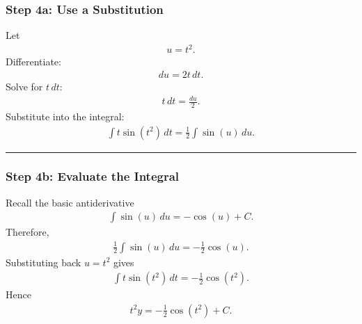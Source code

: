\documentclass[letterpaper,10pt,english]{sphinxmanual}
\begin{document}
\subsubsection{Step 4a: Use a Substitution}
\label{\detokenize{Language/Science_language/ODE_calculus/course_MATH_3035/homework_assignments/index_pdf:step-4a-use-a-substitution}}
\sphinxAtStartPar
Let
\begin{equation*}
\begin{split}u=t^2.\end{split}
\end{equation*}
\sphinxAtStartPar
Differentiate:
\begin{equation*}
\begin{split}du = 2t\,dt.\end{split}
\end{equation*}
\sphinxAtStartPar
Solve for \(t\,dt\):
\begin{equation*}
\begin{split}t\,dt=\frac{du}{2}.\end{split}
\end{equation*}
\sphinxAtStartPar
Substitute into the integral:
\begin{equation*}
\begin{split}\int t\sin(t^2)\,dt = \frac12\int \sin(u)\,du.\end{split}
\end{equation*}

\bigskip\hrule\bigskip



\subsubsection{Step 4b: Evaluate the Integral}
\label{\detokenize{Language/Science_language/ODE_calculus/course_MATH_3035/homework_assignments/index_pdf:step-4b-evaluate-the-integral}}
\sphinxAtStartPar
Recall the basic antiderivative
\begin{equation*}
\begin{split}\int \sin(u)\,du
=
-\cos(u)+C.\end{split}
\end{equation*}
\sphinxAtStartPar
Therefore,
\begin{equation*}
\begin{split}\frac12\int \sin(u)\,du = -\frac12\cos(u).\end{split}
\end{equation*}
\sphinxAtStartPar
Substituting back \(u=t^2\) gives
\begin{equation*}
\begin{split}\int t\sin(t^2)\,dt = -\frac12\cos(t^2).\end{split}
\end{equation*}
\sphinxAtStartPar
Hence
\begin{equation*}
\begin{split}t^2y = -\frac12\cos(t^2)+C.\end{split}
\end{equation*}
\end{document}
